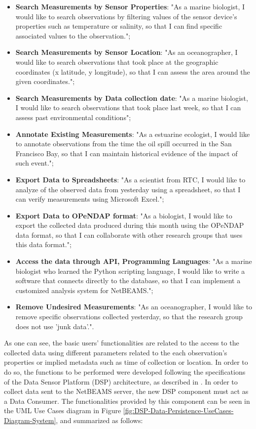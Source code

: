 \begin{itemize}
  \item \textbf{Search Measurements by Sensor Properties}: "As a marine
  biologist, I would like to search observations by filtering values of the 
  sensor device's properties such as temperature or salinity, so that I can 
  find specific associated values to the observation.";
  \item \textbf{Search Measurements by Sensor Location}: "As an oceanographer,
  I would like to search observations that took place at the geographic
  coordinates (x latitude, y longitude), so that I can assess the area around
  the given coordinates.";
  \item \textbf{Search Measurements by Data collection date}: "As a marine 
  biologist, I would like to search observations that took place last week, 
  so that I can assess past environmental conditions";
  \item \textbf{Annotate Existing Measurements}: "As a estuarine ecologist,
  I would like to annotate observations from the time the oil spill occurred
  in the San Francisco Bay, so that I can maintain historical evidence of 
  the impact of such event.";
  \item \textbf{Export Data to Spreadsheets}: "As a scientist from RTC, I 
  would like to analyze of the observed data from yesterday using a 
  spreadsheet, so that I can verify measurements using Microsoft Excel.";
  \item \textbf{Export Data to OPeNDAP format}: "As a biologist, I would 
  like to export the collected data produced during this month using the
  OPeNDAP data format, so that I can collaborate with other research groups
  that uses this data format.";
  \item \textbf{Access the data through API, Programming Languages}: "As a
  marine biologist who learned the Python scripting language, I would like to
  write a software that connects directly to the database, so that I can
  implement a customized analysis system for NetBEAMS.";
  \item \textbf{Remove Undesired Measurements}: "As an oceanographer, I
  would like to remove specific observations collected yesterday, 
  so that the research group does not use 'junk data'.".
\end{itemize}

As one can see, the basic users' functionalities are related to the access to
the collected data using different parameters related to the each observation's
properties or implied metadata such as time of collection or location. In order
to do so, the functions to be performed were developed following the
specifications of the Data Sensor Platform (DSP) architecture, as described in
\cite{netbeams-dsp-architecture}. In order to collect data sent to the NetBEAMS
server, the new DSP component must act as a Data Consumer. The functionalities
provided by this component can be seen in the UML Use Cases diagram \cite{uml}
in Figure \ref{fig:DSP-Data-Persistence-UseCases-Diagram-System}, and
summarized as follows:

